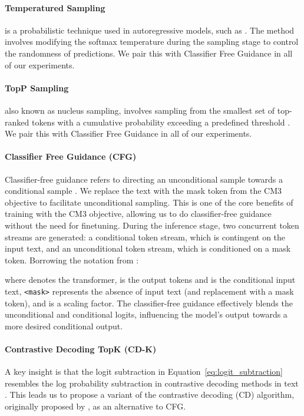 \documentclass{article}
\begin{document}
\paragraph{Temperatured Sampling} is a probabilistic technique used in autoregressive models, such as \citet{DALLE}. The method involves modifying the softmax temperature during the sampling stage to control the randomness of predictions. We pair this with Classifier Free Guidance in all of our experiments.

\paragraph{TopP Sampling} also known as nucleus sampling, involves sampling from the smallest set of top-ranked tokens with a cumulative probability exceeding a predefined threshold \citep{holtzman2020nucleus}. We pair this with Classifier Free Guidance in all of our experiments.

\paragraph{Classifier Free Guidance (CFG)}
Classifier-free guidance refers to directing an unconditional sample towards a conditional sample \citep{make_a_scene}. We replace the text with the mask token from the CM3 objective to facilitate unconditional sampling. This is one of the core benefits of training with the CM3 objective, allowing us to do classifier-free guidance without the need for finetuning. During the inference stage, two concurrent token streams are generated: a conditional token stream, which is contingent on the input text, and an unconditional token stream, which is conditioned on a mask token. Borrowing the notation from \citet{make_a_scene}:



where  denotes the transformer,  is the output tokens and  is the conditional input text, \texttt{<mask>} represents the absence of input text (and replacement with a mask token), and  is a scaling factor. The classifier-free guidance effectively blends the unconditional and conditional logits, influencing the model's output towards a more desired conditional output.

\paragraph{Contrastive Decoding TopK (CD-K)}
A key insight is that the logit subtraction in Equation~\ref{eq:logit_subtraction} resembles the log probability subtraction in contrastive decoding methods in text \citep{contrastive_decoding}. This leads us to propose a variant of the contrastive decoding (CD) algorithm, originally proposed by \citet{contrastive_decoding}, as an alternative to CFG.
\end{document}
